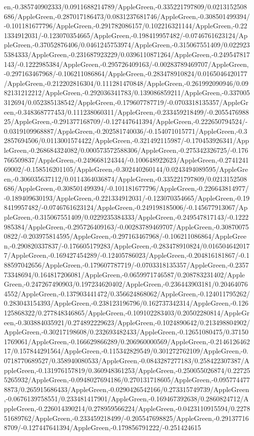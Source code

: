 {\begin{tikzternal}
{en,-0.385740902333/0.0911688214789/AppleGreen,-0.335221797809/0.0213152508686/AppleGreen,-0.287017186473/0.0831237681746/AppleGreen,-0.308501499394/-0.101181677796/AppleGreen,-0.291782086157/0.102216321144/AppleGreen,-0.221334912031/-0.123070354665/AppleGreen,-0.198419957482/-0.0746761623124/AppleGreen,-0.37052876406/0.0461245753974/AppleGreen,-0.315067551409/0.0229235384333/AppleGreen,-0.231687923229/0.0396110871264/AppleGreen,-0.249547817143/-0.1222985384/AppleGreen,-0.295726409163/-0.00283789469707/AppleGreen,-0.297163467968/-0.106211086864/AppleGreen,-0.283478910824/0.0165046420177/AppleGreen,-0.212202816304/0.111281470848/AppleGreen,-0.261992090946/0.0982131212212/AppleGreen,-0.292036341783/0.139086859211/AppleGreen,-0.337005312694/0.052385138542/AppleGreen,-0.179607787719/-0.0703318135357/AppleGreen,-0.348368777453/0.111238060311/AppleGreen,-0.233459218499/-0.205547698825/AppleGreen,-0.291377168709/-0.127447641394/AppleGreen,-0.222650794524/-0.0319109968887/AppleGreen,-0.202581740036/-0.154071015771/AppleGreen,-0.32857694506/0.0113001574422/AppleGreen,-0.321492115987/-0.170453926341/AppleGreen,-0.268684324082/0.000573572588306/AppleGreen,-0.275342326725/-0.176766509837/AppleGreen,-0.249668124344/-0.100648922623/AppleGreen,-0.274124169002/-0.158516201105/AppleGreen,-0.302440260144/0.0243494089595/AppleGreen,-0.306035637112/0.0114364036874/AppleGreen,-0.335221797809/0.0213152508686/AppleGreen,-0.308501499394/-0.101181677796/AppleGreen,-0.226643814977/-0.189409630193/AppleGreen,-0.221334912031/-0.123070354665/AppleGreen,-0.198419957482/-0.0746761623124/AppleGreen,-0.249198185006/-0.145677913067/AppleGreen,-0.315067551409/0.0229235384333/AppleGreen,-0.249547817143/-0.1222985384/AppleGreen,-0.295726409163/-0.00283789469707/AppleGreen,-0.308700750822/-0.203975814595/AppleGreen,-0.297163467968/-0.106211086864/AppleGreen,-0.290820337837/-0.176605179283/AppleGreen,-0.283478910824/0.0165046420177/AppleGreen,-0.169427454289/-0.12405786023/AppleGreen,-0.204816181867/-0.188597042656/AppleGreen,-0.179607787719/-0.0703318135357/AppleGreen,-0.235773348694/0.164817206081/AppleGreen,-0.0659971746587/0.208783231402/AppleGreen,-0.247267490903/0.197234620402/AppleGreen,-0.236443903181/0.204640764552/AppleGreen,-0.137903441472/0.356624868062/AppleGreen,-0.124011795262/0.283043154393/AppleGreen,-0.238123196796/0.162737342314/AppleGreen,-0.126125868322/0.277848346865/AppleGreen,-0.109102283403/0.20502280814/AppleGreen,-0.303884035921/0.274892229623/AppleGreen,-0.1024890642/0.213498804902/AppleGreen,-0.30217198608/0.232693482433/AppleGreen,-0.12651080475/0.371501769061/AppleGreen,-0.166629866289/0.206960000569/AppleGreen,-0.214612646217/0.157844291564/AppleGreen,-0.115342829549/0.301272762109/AppleGreen,-0.0718770689527/0.358940080533/AppleGreen,-0.0843287277183/0.258422307387/AppleGreen,-0.131976157819/0.360948361253/AppleGreen,-0.250055026874/0.227255265932/AppleGreen,-0.0948027694186/0.270131718605/AppleGreen,-0.0957744778873/0.265915686433/AppleGreen,-0.0290426542166/0.273315749739/AppleGreen,-0.0676139758551/0.233481417901/AppleGreen,-0.169467392638/0.2860824712/AppleGreen,-0.226014390214/0.278959566224/AppleGreen,-0.0423110915594/0.227851689762/AppleGreen,-0.233459218499/-0.205547698825/AppleGreen,-0.291377168709/-0.127447641394/AppleGreen,-0.179856791222/-0.251424615}
\end{tikzternal}}
